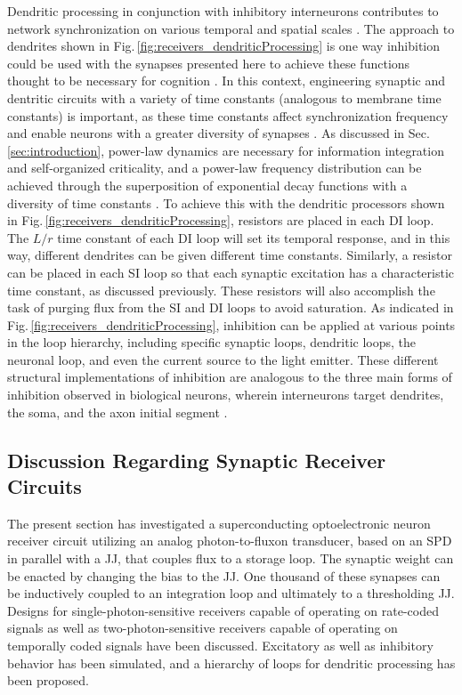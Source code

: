 \documentclass[twocolumn]{article}
\begin{document}
Dendritic processing in conjunction with inhibitory interneurons contributes to network synchronization on various temporal and spatial scales \cite{vala2001,enfr2001,sase2001,bu2006,buwa2012,robu2015}. The approach to dendrites shown in Fig.\,\ref{fig:receivers_dendriticProcessing} is one way inhibition could be used with the synapses presented here to achieve these functions thought to be necessary for cognition \cite{budr2004,fr2015}. In this context, engineering synaptic and dentritic circuits with a variety of time constants (analogous to membrane time constants) is important, as these time constants affect synchronization frequency \cite{lued1997} and enable neurons with a greater diversity of synapses \cite{ma2016}. As discussed in Sec.\,\ref{sec:introduction}, power-law dynamics are necessary for information integration and self-organized criticality, and a power-law frequency distribution can be achieved through the superposition of exponential decay functions with a diversity of time constants \cite{be2007}. To achieve this with the dendritic processors shown in Fig.\,\ref{fig:receivers_dendriticProcessing}, resistors are placed in each DI loop. The $L/r$ time constant of each DI loop will set its temporal response, and in this way, different dendrites can be given different time constants. Similarly, a resistor can be placed in each SI loop so that each synaptic excitation has a characteristic time constant, as discussed previously. These resistors will also accomplish the task of purging flux from the SI and DI loops to avoid saturation. As indicated in Fig.\,\ref{fig:receivers_dendriticProcessing}, inhibition can be applied at various points in the loop hierarchy, including specific synaptic loops, dendritic loops, the neuronal loop, and even the current source to the light emitter. These different structural implementations of inhibition are analogous to the three main forms of inhibition observed in biological neurons, wherein interneurons target dendrites, the soma, and the axon initial segment \cite{robu2015}.
	
\subsection{\label{sec:discussion_receiverCircuits}Discussion Regarding Synaptic Receiver Circuits}
The present section has investigated a superconducting optoelectronic neuron receiver circuit utilizing an analog photon-to-fluxon transducer, based on an SPD in parallel with a JJ, that couples flux to a storage loop. The synaptic weight can be enacted by changing the bias to the JJ. One thousand of these synapses can be inductively coupled to an integration loop and ultimately to a thresholding JJ. Designs for single-photon-sensitive receivers capable of operating on rate-coded signals as well as two-photon-sensitive receivers capable of operating on temporally coded signals have been discussed. Excitatory as well as inhibitory behavior has been simulated, and a hierarchy of loops for dendritic processing has been proposed.
\end{document}

